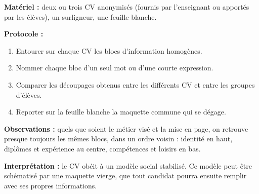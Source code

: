 \documentclass[11pt]{article}
\begin{document}
\begin{experience}
\textbf{Matériel :} deux ou trois CV anonymisés (fournis par l'enseignant ou apportés par les élèves), un surligneur, une feuille blanche.

\textbf{Protocole :}
\begin{enumerate}
\item Entourer sur chaque CV les blocs d'information homogènes.
\item Nommer chaque bloc d'un seul mot ou d'une courte expression.
\item Comparer les découpages obtenus entre les différents CV et entre les groupes d'élèves.
\item Reporter sur la feuille blanche la maquette commune qui se dégage.
\end{enumerate}

\textbf{Observations :} quels que soient le métier visé et la mise en page, on retrouve presque toujours les mêmes blocs, dans un ordre voisin : identité en haut, diplômes et expérience au centre, compétences et loisirs en bas.

\textbf{Interprétation :} le CV obéit à un modèle social stabilisé. Ce modèle peut être schématisé par une maquette vierge, que tout candidat pourra ensuite remplir avec ses propres informations.
\end{experience}
\end{document}
